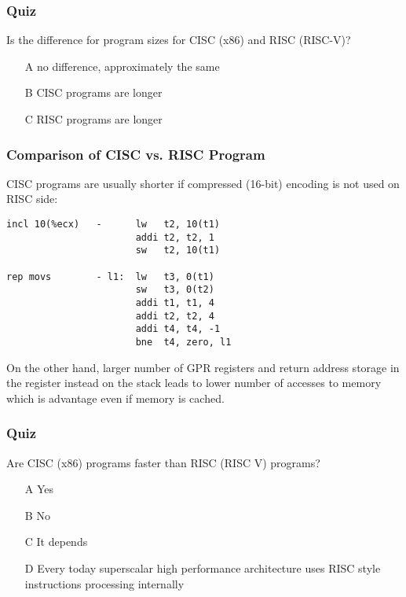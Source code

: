 \documentclass{beamer}
\begin{document}
\begin{frame}
\frametitle{Quiz}
Is the difference for program sizes for CISC (x86) and RISC (RISC-V)?
\begin{itemize}
\item[A] no difference, approximately the same
\item[B] CISC programs are longer
\item[C] RISC programs are longer
\end{itemize}
\end{frame}


\begin{frame}[fragile]
\frametitle{Comparison of CISC vs. RISC Program}
CISC programs are usually shorter if compressed (16-bit) encoding is not used on RISC side:
\begin{verbatim}
incl 10(%ecx)   -      lw   t2, 10(t1)
                       addi t2, t2, 1
                       sw   t2, 10(t1)

rep movs        - l1:  lw   t3, 0(t1) 
                       sw   t3, 0(t2)
                       addi t1, t1, 4
                       addi t2, t2, 4
                       addi t4, t4, -1
                       bne  t4, zero, l1 
\end{verbatim}
On the other hand, larger number of GPR registers and return address storage in the register instead on the stack leads to lower number of accesses to memory which is advantage even if memory is cached.
\end{frame}

\begin{frame}
\frametitle{Quiz}
Are CISC (x86) programs faster than RISC (RISC V) programs?
\begin{itemize}
\item[A] Yes
\item[B] No
\item[C] It depends
\item[D] Every today superscalar high performance architecture uses RISC style instructions processing internally
\end{itemize}

\end{frame}
\end{document}
